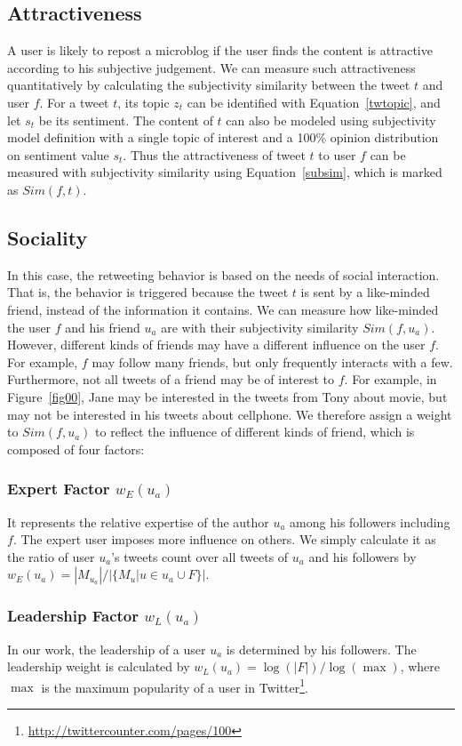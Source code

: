 \documentclass[letterpaper]{article}
\begin{document}
\subsection{Attractiveness}

A user is likely to repost a microblog if the user finds the content is attractive according to his subjective judgement. We can measure such attractiveness quantitatively by calculating the subjectivity similarity between the tweet $ t $ and user $ f $. For a tweet $ t $, its topic $ z_t $ can be identified with Equation~\ref{twtopic}, and let $ s_t $ be its sentiment. The content of $ t $ can also be modeled using subjectivity model definition with a single topic of interest and a 100\% opinion distribution on sentiment value $s_t$. Thus the attractiveness of tweet $t$ to user $f$ can be measured with subjectivity similarity using Equation~\ref{subsim}, which is marked as $ Sim(f,t) $.

\subsection{Sociality}

In this case, the retweeting behavior is based on the needs of social interaction. That is, the behavior is triggered because the tweet $ t $ is sent by a like-minded friend, instead of the information it contains. We can measure how like-minded the user $ f $ and his friend $ u_a $ are with their subjectivity similarity $ Sim(f,u_a) $.  However, different kinds of friends may have a different influence on the user $ f $. For example, $ f $ may follow many friends, but only frequently interacts with a few. Furthermore, not all tweets of a friend may be of interest to $ f $. For example, in Figure~\ref{fig00}, Jane may be interested in the tweets from Tony about movie, but may not be interested in his tweets about cellphone. We therefore assign a weight to $ Sim(f,u_a) $ to reflect the influence of different kinds of friend, which
is composed of four factors:
\subsubsection{Expert Factor $ w_E(u_a) $} It represents the relative expertise of the author $ u_a $ among his followers including $ f $. The expert user imposes more influence on others. We simply calculate it as the ratio of user $ u_a $'s tweets count over all tweets of $ u_a $ and his followers by $ w_E(u_a)=|M_{u_a}|/|\{M_u|u \in u_a \cup F \}|  $.
\subsubsection{Leadership Factor $ w_L(u_a) $} In our work, the leadership of a user $ u_a $ is determined by his followers. The leadership weight is calculated by $ w_L(u_a)=\log (|F|)/\log(\max) $, where $ \max $ is the maximum popularity of a user in Twitter\footnote{\url{http://twittercounter.com/pages/100}}.
\end{document}
